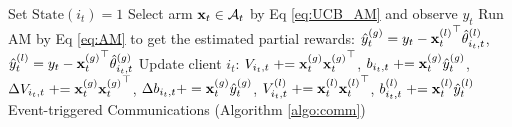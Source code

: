 \begin{algorithm}[h]
\begin{algorithmic}[1]
                \STATE Set $\text{State}(i_{t})=1$
            \ENDIF
        \ELSE
            \STATE Select arm $\mathbf{x}_{t}\in\mathcal{A}_{t}$ by Eq \eqref{eq:UCB_AM} and observe $y_{t}$
            \STATE Run AM by Eq \eqref{eq:AM} to get the estimated partial rewards: $\hat{y}^{(g)}_{t}=y_{t}-{\mathbf{x}_{t}^{(l)}}^{\top} \hat{\theta}^{(l)}_{i_{t},t}$, $\hat{y}^{(l)}_{t}=y_{t}-{\mathbf{x}_{t}^{(g)}}^{\top} \hat{\theta}^{(g)}_{i_{t},t}$
            \STATE Update client $i_{t}$: ${V}_{i_{t},t} \mathrel{+}= \mathbf{x}_{t}^{(g)}{\mathbf{x}_{t}^{(g)}}^{\top}$, ${b}_{i_{t},t} \mathrel{+}= \mathbf{x}^{(g)}_{t} \hat{y}^{(g)}_{t}$, $\Delta{V}_{i_{t},t} \mathrel{+}= \mathbf{x}_{t}^{(g)}{\mathbf{x}_{t}^{(g)}}^{\top}$, $\Delta{b}_{i_{t},t}+=\mathbf{x}^{(g)}_{t} \hat{y}^{(g)}_{t}$, ${V}^{(l)}_{i_{t},t} \mathrel{+}= \mathbf{x}_{t}^{(l)}{\mathbf{x}_{t}^{(l)}}^{\top}$, ${b}^{(l)}_{i_{t},t} \mathrel{+}= \mathbf{x}^{(l)}_{t} \hat{y}^{(l)}_{t}$ 
        \ENDIF
        \STATE Event-triggered Communications (Algorithm \ref{algo:comm})


\end{algorithmic}
\end{algorithm}
